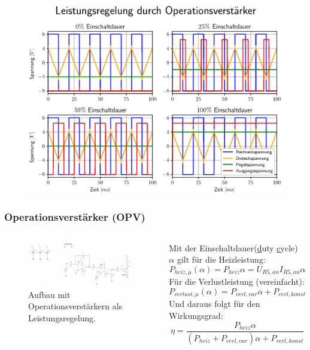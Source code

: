 \documentclass{beamer}
\begin{document}
	\begin{frame}
		\begin{center}
			\begin{figure}[tbh]
				\centering
				\includegraphics[width=0.95\linewidth]{medien/2.eps}
			\end{figure}
		\end{center}
	\end{frame}
	\begin{frame}
		\frametitle{Operationsverstärker (OPV)}
		\begin{columns}
			\column{0.5\textwidth}
			\begin{figure}[tbh]
				\centering
				\includegraphics[width=1\linewidth , trim={10cm 0 0 0}]{medien/V2-0.png}
				\caption[Zweiter Aufbau]{Aufbau mit Operationsverstärkern als Leistungsregelung.}
			\end{figure}
			\column{0.5\textwidth}
			Mit der Einschaltdauer(\underline{d}uty \underline{c}ycle) $\alpha$ gilt für die Heizleistung:
			\begin{equation*}
				P_{heiz,\mu }(\alpha )= P_{heiz}\alpha = U_{R5,an}I_{R5,an}\alpha
			\end{equation*}
			Für die Verlustleistung (vereinfacht):
			\begin{equation*}
				P_{verlust,\mu }(\alpha )= P_{verl, var}\alpha + P_{verl, konst}
			\end{equation*}
			Und daraus folgt für den Wirkungsgrad:
			\begin{equation*}
				\eta=\frac{P_{heiz}\alpha }{(P_{heiz} + P_{verl, var})\alpha + P_{verl, konst}}
			\end{equation*}
		\end{columns}
	\end{frame}
\end{document}
